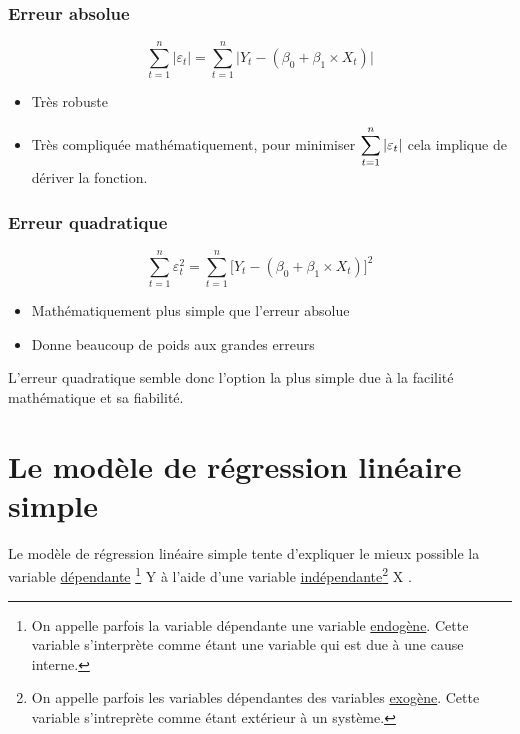 \documentclass[11pt,french]{report}
\begin{document}
\subsubsection{Erreur absolue}
\begin{equation}
\displaystyle\sum_{t=1}^n |\varepsilon_t| = \displaystyle\sum_{t=1}^n \Big| Y_t - (\beta_0 + \beta_1\times X_t) \Big| 
\end{equation}

\bigskip
\begin{itemize}
\item Très robuste
\item Très compliquée mathématiquement, pour minimiser $\displaystyle\displaystyle\sum_{t=1}^n |\varepsilon_t|$ cela implique de dériver la fonction.
\end{itemize}

\subsubsection{Erreur quadratique}
\begin{equation}
\displaystyle\sum_{t=1}^n \varepsilon_t^2 = \displaystyle\sum_{t=1}^n \Big[ Y_t - (\beta_0 + \beta_1\times X_t) \Big]^2 
\end{equation}

\bigskip
\begin{itemize}
\item Mathématiquement plus simple que l'erreur absolue
\item Donne beaucoup de poids aux grandes erreurs
\end{itemize}

\bigskip
L'erreur quadratique semble donc l'option la plus simple due à la facilité mathématique et sa fiabilité.

\section{Le modèle de régression linéaire simple}
Le modèle de régression linéaire simple tente d'expliquer le mieux possible la variable \href{https://fr.wikipedia.org/wiki/Variable_dépendante}{dépendante} \footnote{On appelle parfois la variable dépendante une variable \href{https://fr.wikipedia.org/wiki/Endogène}{endogène}. Cette variable s'interprète comme étant une variable qui est due à une cause interne.}  Y à l'aide d'une variable \href{https://fr.wikipedia.org/wiki/Variable_indépendante}{indépendante}\footnote{On appelle parfois les variables dépendantes des variables \href{https://fr.wikipedia.org/wiki/Exogène}{exogène}. Cette variable s'intreprète comme étant extérieur à un système.} X . 
\end{document}
